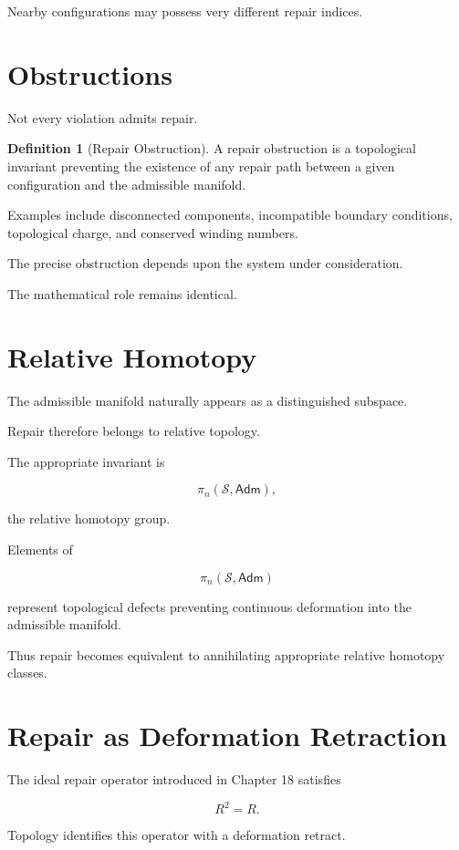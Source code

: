 \documentclass[11pt,oneside]{book}
\numberwithin{equation}{chapter}
\theoremstyle{definition}
\newtheorem{definition}{Definition}[chapter]
\theoremstyle{plain}
\newcommand{\State}{\mathcal{S}}
\newcommand{\Adm}{\mathsf{Adm}}
\begin{document}
Nearby configurations may possess very different repair indices.

\section{Obstructions}

Not every violation admits repair.

\begin{definition}[Repair Obstruction]

A repair obstruction is a topological invariant preventing the existence of
any repair path between a given configuration and the admissible manifold.

\end{definition}

Examples include disconnected components, incompatible boundary conditions,
topological charge, and conserved winding numbers.

The precise obstruction depends upon the system under consideration.

The mathematical role remains identical.

\section{Relative Homotopy}

The admissible manifold naturally appears as a distinguished subspace.

Repair therefore belongs to relative topology.

The appropriate invariant is

\[
\pi_n(\State,\Adm),
\]

the relative homotopy group.

Elements of

\[
\pi_n(\State,\Adm)
\]

represent topological defects preventing continuous deformation into the
admissible manifold.

Thus repair becomes equivalent to annihilating appropriate relative
homotopy classes.

\section{Repair as Deformation Retraction}

The ideal repair operator introduced in Chapter 18 satisfies

\[
R^2=R.
\]

Topology identifies this operator with a deformation retract.
\end{document}
